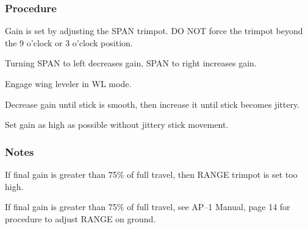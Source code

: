 % 
% 
%
 \subsubsection*{Procedure}
 \begin{compactenum}
    \item Gain is set by adjusting the SPAN trimpot.  DO NOT force the trimpot beyond the 9 o'clock or 3 o'clock position.
    \item Turning SPAN to left decreases gain, SPAN to right increases gain.
    \item Engage wing leveler in WL mode.
    \item Decrease gain until stick is smooth, then increase it until stick becomes jittery.
    \item Set gain as high as possible without jittery stick movement.
    \end{compactenum}

 \subsubsection*{Notes}
 \begin{compactenum}
    \item If final gain is greater than 75\% of full travel, then RANGE trimpot is set too high.
    \item If final gain is greater than 75\% of full travel, see AP--1 Manual, page 14 for procedure to adjust RANGE on ground.
    \end{compactenum}
